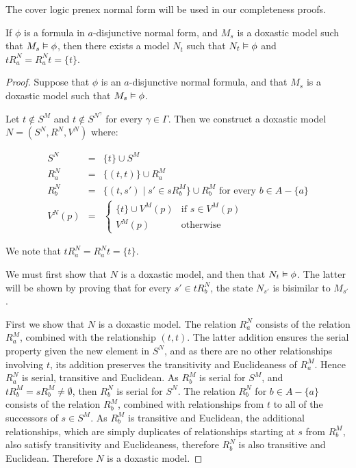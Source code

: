 The cover logic prenex normal form will be used in our completeness proofs.

\begin{lemma}\label{kd45-successors}
If $\phi$ is a formula in $a$-disjunctive normal form, and $M_s$ is a doxastic
model such that $M_s \vDash \phi$, then there exists a model $N_t$ such that
$N_t \vDash \phi$ and $tR^N_a = R^N_at = \{t\}$.
\end{lemma}

\begin{proof}
Suppose that $\phi$ is an $a$-disjunctive normal formula, and that $M_s$ is a
doxastic model such that $M_s \vDash \phi$. 

Let $t \notin S^M$ and $t \notin S^{N^\gamma}$ for every $\gamma \in \Gamma$.
Then we construct a doxastic model $N = (S^N, R^N, V^N)$ where:

\begin{eqnarray*}
S^N &=& \{t\} \cup S^M\\
R^N_a &=& \{(t, t)\} \cup R^M_a\\
R^N_b &=& \{(t, s') \mid s' \in sR^M_b\} \cup R^M_b \text{ for every $b \in A -
\{a\}$}\\
V^N(p) &=& \begin{cases}
\{t\} \cup V^M(p) & \text{if $s \in V^M(p)$}\\
V^M(p) & \text{otherwise}
\end{cases}
\end{eqnarray*}

We note that $tR^N_a = R^N_at = \{t\}$.

We must first show that $N$ is a doxastic model, and then that $N_t \vDash
\phi$. The latter will be shown by proving that for every $s' \in tR^N_b$, the
state $N_{s'}$ is bisimilar to $M_{s'}$.

First we show that $N$ is a doxastic model. The relation $R^N_a$ consists of the
relation $R^M_a$, combined with the relationship $(t,t)$. The latter addition
ensures the serial property given the new element in $S^N$, and as there are no
other relationships involving $t$, its addition preserves the transitivity and
Euclideaness of $R^M_a$. Hence $R^N_a$ is serial, transitive and Euclidean.
As $R^M_b$ is serial for $S^M$, and $tR^M_b = sR^M_b \ne \emptyset$, then
$R^N_b$ is serial for $S^N$. The relation $R^N_b$ for $b \in A - \{a\}$ consists
of the relation $R^M_b$, combined with relationships from $t$ to all of the
successors of $s \in S^M$. As $R^M_b$ is transitive and Euclidean, the
additional relationships, which are simply duplicates of relationships starting
at $s$ from $R^M_b$, also satisfy transitivity and Euclideaness, therefore
$R^N_b$ is also transitive and Euclidean. Therefore $N$ is a doxastic model.


\end{proof}
